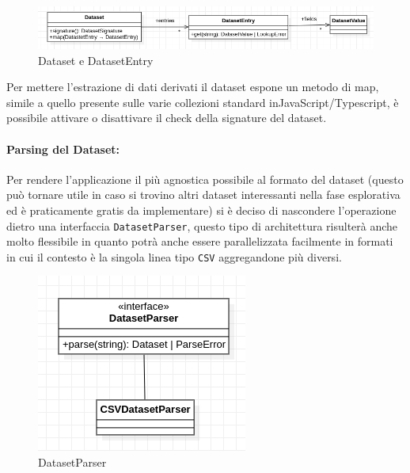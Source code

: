 \begin{figure}[h!]
  \centering
  \includegraphics[scale=0.55]{../../assets/classi_uml/dataset.png}
  \caption{Dataset e DatasetEntry}
\end{figure}

\noindent
Per mettere l'estrazione di dati derivati il dataset espone un metodo di map,
simile a quello presente sulle varie collezioni standard inJavaScript/Typescript,
è possibile attivare o disattivare il check della signature del dataset.

\paragraph{Parsing del Dataset:}
Per rendere l'applicazione il più agnostica possibile al formato del dataset
(questo può tornare utile in caso si trovino altri dataset interessanti nella
fase esplorativa ed è praticamente gratis da implementare) si è deciso di
nascondere l'operazione dietro una interfaccia \texttt{DatasetParser}, questo
tipo di architettura risulterà anche molto flessibile in quanto potrà anche
essere parallelizzata facilmente in formati in cui il contesto è la singola
linea tipo \texttt{CSV} aggregandone più diversi.
\begin{figure}[h!]
  \centering
  \includegraphics[scale=0.55]{../../assets/classi_uml/datasetparser.png}
  \caption{DatasetParser}
\end{figure}

